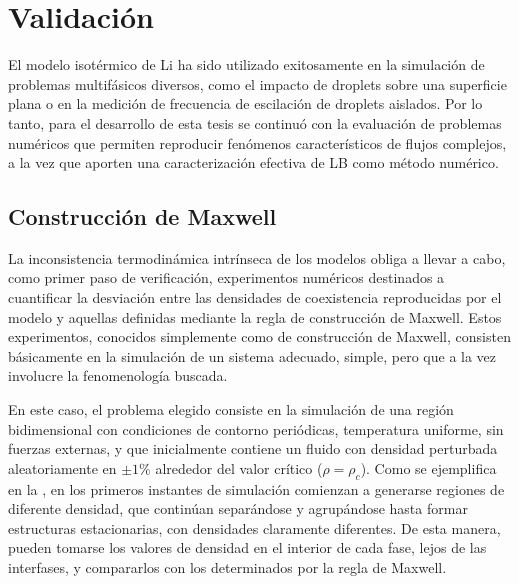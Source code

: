 \section{Validaci\'on}

El modelo isot\'ermico de Li ha sido utilizado exitosamente en la simulaci\'on de problemas multif\'asicos diversos, como el impacto de droplets sobre una superficie plana o en la medici\'on de frecuencia de escilaci\'on de droplets aislados. Por lo tanto, para el desarrollo de esta tesis se continu\'o con la evaluaci\'on de problemas num\'ericos que permiten reproducir fen\'omenos caracter\'isticos de flujos complejos, a la vez que aporten una caracterizaci\'on efectiva de LB como m\'etodo num\'erico.

\subsection{Construcci\'on de Maxwell}

La inconsistencia termodin\'amica intr\'inseca de los modelos \pp{} obliga a llevar a cabo, como primer paso de verificaci\'on, experimentos num\'ericos destinados a cuantificar la desviaci\'on entre las densidades de coexistencia reproducidas por el modelo y aquellas definidas mediante la regla de construcci\'on de Maxwell. Estos experimentos, conocidos simplemente como de construcci\'on de Maxwell, consisten b\'asicamente en la simulaci\'on de un sistema adecuado, simple, pero que a la vez involucre la fenomenolog\'ia buscada.

En este caso, el problema elegido consiste en la simulaci\'on de una regi\'on bidimensional con condiciones de contorno peri\'odicas, temperatura uniforme, sin fuerzas externas, y que inicialmente contiene un fluido con densidad perturbada aleatoriamente en  $\pm 1\%$ alrededor del valor cr\'itico ($\rho=\rho_c$). Como se ejemplifica en la , en los primeros instantes de simulaci\'on comienzan a generarse regiones de diferente densidad, que contin\'uan separ\'andose y agrup\'andose hasta formar estructuras estacionarias, con densidades claramente diferentes. De esta manera, pueden tomarse los valores de densidad en el interior de cada fase, lejos de las interfases, y compararlos con los determinados por la regla de Maxwell.

